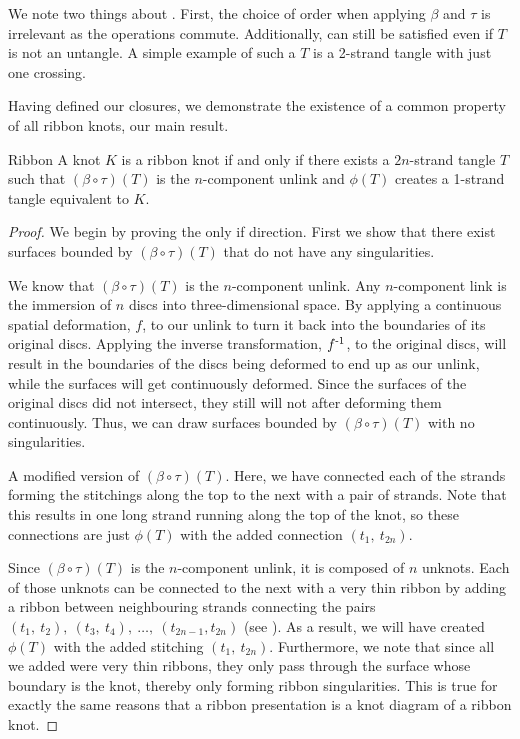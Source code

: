 \begin{paper}
\begin{paperwhere}
\end{paperwhere}

We note two things about \eqUnlink.
First, the choice of order when applying $\beta$ and $\tau$ is irrelevant as the
operations commute.
Additionally, \eqUnlink can still be satisfied even if $T$ is not an untangle.
A simple example of such a $T$ is a 2-strand tangle with just one crossing.

Having defined our closures, we demonstrate the existence of a common property
of all ribbon knots, our main result.

\begin{paperthm}{Ribbon}
A knot $K$ is a ribbon knot if and only if there exists a $2n$-strand tangle $T$
such that $(\beta\circ\tau)(T)$ is the $n$-component unlink and $\phi(T)$
creates a 1-strand tangle equivalent to $K$.
\end{paperthm}
\begin{proof}
We begin by proving the only if direction.
First we show that there exist surfaces bounded by $(\beta\circ\tau)(T)$ that do
not have any singularities.

We know that $(\beta\circ\tau)(T)$ is the $n$-component unlink.
Any $n$-component link is the immersion of $n$ discs into three-dimensional
space.
By applying a continuous spatial deformation, $f$, to our unlink to turn it back
into the boundaries of its original discs.
Applying the inverse transformation, $f^{\text-1}$, to the original discs, will
result in the boundaries of the discs being deformed to end up as our unlink,
while the surfaces will get continuously deformed.
Since the surfaces of the original discs did not intersect, they still will not
after deforming them continuously.
Thus, we can draw surfaces bounded by $(\beta\circ\tau)(T)$ with no
singularities.

{A modified version of $(\beta\circ\tau)(T)$.
Here, we have connected each of the strands forming the stitchings along the top
to the next with a pair of strands.
Note that this results in one long strand running along the top of the knot, so
these connections are just $\phi(T)$ with the added connection $(t_1,~t_{2n})$.}

Since $(\beta\circ\tau)(T)$ is the $n$-component unlink, it is composed of $n$
unknots.
Each of those unknots can be connected to the next with a very thin ribbon by
adding a ribbon between neighbouring strands connecting the pairs
$(t_1,~t_2),~(t_3,~t_4),~\dots,~(t_{2n-1},t_{2n})$ (see \figProof).
As a result, we will have created $\phi(T)$ with the added stitching
$(t_1,~t_{2n})$.
Furthermore, we note that since all we added were very thin ribbons, they only
pass through the surface whose boundary is the knot, thereby only forming ribbon
singularities.
This is true for exactly the same reasons that a ribbon presentation is a knot
diagram of a ribbon knot.


\end{proof}
\end{paper}
